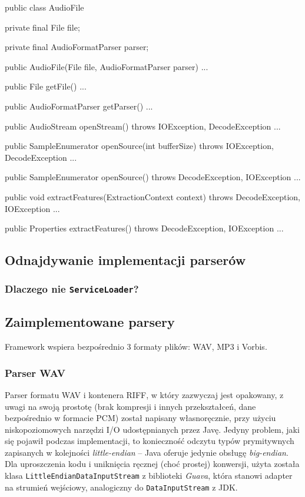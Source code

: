 \begin{java}
public class AudioFile {

    private final File file;

    private final AudioFormatParser parser;

    public AudioFile(File file, AudioFormatParser parser) { ... }

    public File getFile() { ... }

    public AudioFormatParser getParser() { ... }

    public AudioStream openStream() throws IOException, DecodeException { ... }

    public SampleEnumerator openSource(int bufferSize) throws IOException, DecodeException { ... }

    public SampleEnumerator openSource() throws DecodeException, IOException { ... }

    public void extractFeatures(ExtractionContext context) throws DecodeException, 
            IOException { ...}

    public Properties extractFeatures() throws DecodeException, IOException { ... }

}
\end{java}


\subsection{Odnajdywanie implementacji parserów}
\label{sec:odnajdywanie_implementacji}

\subsubsection{Dlaczego nie \texttt{ServiceLoader}?}
\label{sec:dlaczego_nie_service_loader}

\subsection{Zaimplementowane parsery}

Framework wspiera bezpośrednio 3 formaty plików: WAV, MP3 i Vorbis.

\subsubsection{Parser WAV}

Parser formatu WAV i kontenera RIFF, w który zazwyczaj jest opakowany, z uwagi na swoją prostotę
(brak kompresji i innych przekształceń, dane bezpośrednio w formacie PCM) został napisany
własnoręcznie, przy użyciu niskopoziomowych narzędzi I/O udostępnianych przez Javę. Jedyny problem,
jaki się pojawił podczas implementacji, to konieczność odczytu typów prymitywnych zapisanych w
kolejności \textit{little-endian} -- Java oferuje jedynie obsługę \textit{big-endian}. Dla
uproszczenia kodu i uniknięcia ręcznej (choć prostej) konwersji, użyta została klasa
\texttt{LittleEndianDataInputStream} z biblioteki \emph{Guava}, która stanowi adapter na strumień
wejściowy, analogiczny do \texttt{DataInputStream} z JDK.

